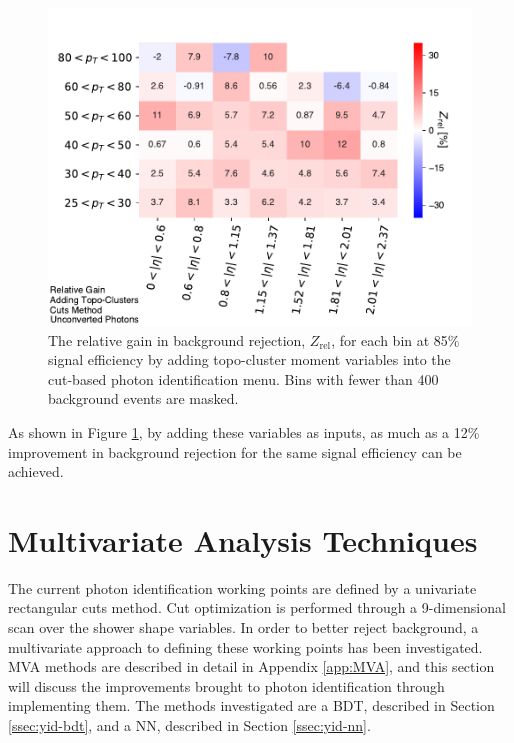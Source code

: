 \begin{figure}[!htb]
    \centering
    \includegraphics[width=.85\textwidth]{chapters/chapter4_photonID/images/gain_topoAdded_unconverted.pdf}
    \caption[The relative gain in background rejection, $Z_{\text{rel}}$, for each \etaPt bin at 85\% signal efficiency by adding topo-cluster moment variables into the cut-based photon identification menu]{The relative gain in background rejection, $Z_{\text{rel}}$, for each \etaPt bin at 85\% signal efficiency by adding topo-cluster moment variables into the cut-based photon identification menu. Bins with fewer than 400 background events are masked.}
    \label{fig:gain-topo-clusters-added-unconverted}
\end{figure}
As shown in Figure \ref{fig:gain-topo-clusters-added-unconverted}, by adding these variables as inputs, as much as a 12\% improvement in background rejection for the same signal efficiency can be achieved.

\section{Multivariate Analysis Techniques} \label{sec:mva-yid}

The current photon identification working points are defined by a univariate rectangular cuts method. Cut optimization is performed through a 9-dimensional scan over the shower shape variables. In order to better reject background, a multivariate approach to defining these working points has been investigated. \gls{MVA} methods are described in detail in Appendix \ref{app:MVA}, and this section will discuss the improvements brought to photon identification through implementing them. The methods investigated are a \gls{BDT}, described in Section \ref{ssec:yid-bdt}, and a \gls{NN}, described in Section \ref{ssec:yid-nn}.


